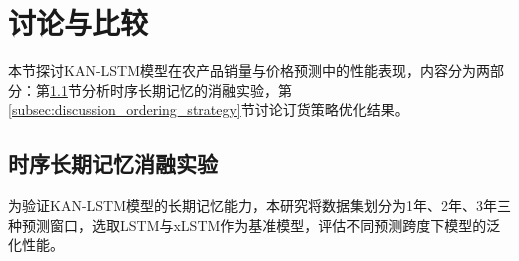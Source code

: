 \documentclass[lang=cn,12pt,a4paper]{elegantpaper}
\begin{document}
\section{讨论与比较}
\label{sec:discussion_comparison}
本节探讨KAN-LSTM模型在农产品销量与价格预测中的性能表现，内容分为两部分：第\ref{subsec:ablation_study}节分析时序长期记忆的消融实验，第\ref{subsec:discussion_ordering_strategy}节讨论订货策略优化结果。

\subsection{时序长期记忆消融实验}
\label{subsec:ablation_study}

为验证KAN-LSTM模型的长期记忆能力，本研究将数据集划分为1年、2年、3年三种预测窗口，选取LSTM与xLSTM作为基准模型，评估不同预测跨度下模型的泛化性能。
\end{document}
